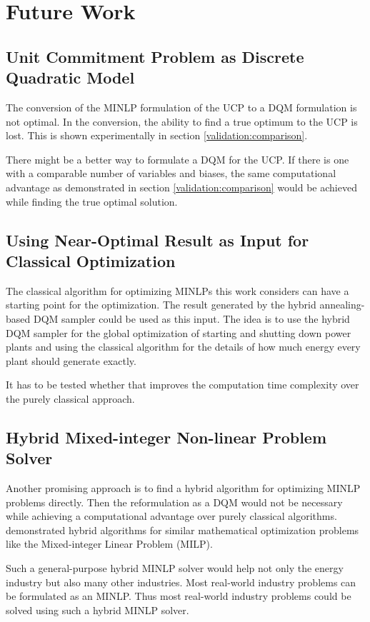 \section{Future Work}

\subsection{Unit Commitment Problem as Discrete Quadratic Model}

The conversion of the MINLP formulation of the UCP to a DQM formulation is not optimal.
In the conversion, the ability to find a true optimum to the UCP is lost.
This is shown experimentally in section \ref{validation:comparison}.

There might be a better way to formulate a DQM for the UCP.
If there is one with a comparable number of variables and biases, the same computational advantage as demonstrated in section \ref{validation:comparison} would be achieved while finding the true optimal solution.

\subsection{Using Near-Optimal Result as Input for Classical Optimization}

The classical algorithm for optimizing MINLPs this work considers can have a starting point for the optimization.
The result generated by the hybrid annealing-based DQM sampler could be used as this input.
The idea is to use the hybrid DQM sampler for the global optimization of starting and shutting down power plants and using the classical algorithm for the details of how much energy every plant should generate exactly.

It has to be tested whether that improves the computation time complexity over the purely classical approach.

\subsection{Hybrid Mixed-integer Non-linear Problem Solver}

Another promising approach is to find a hybrid algorithm for optimizing MINLP problems directly.
Then the reformulation as a DQM would not be necessary while achieving a computational advantage over purely classical algorithms.
\citeauthor{Ajagekar2020} demonstrated hybrid algorithms for similar mathematical optimization problems like the Mixed-integer Linear Problem (MILP).
\cite{Ajagekar2020}

Such a general-purpose hybrid MINLP solver would help not only the energy industry but also many other industries.
Most real-world industry problems can be formulated as an MINLP.
\cite{Belotti2009}
Thus most real-world industry problems could be solved using such a hybrid MINLP solver.
